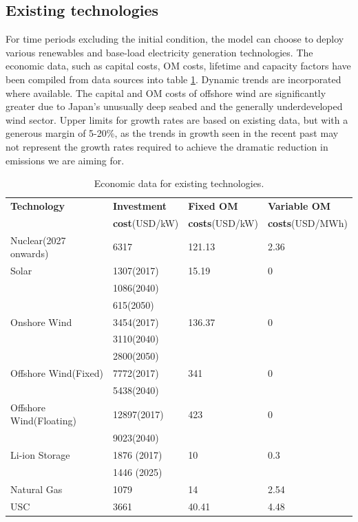 \subsection{Existing technologies}

For time periods excluding the initial condition, the model can choose to deploy various renewables and base-load electricity generation technologies. The economic data, such as capital costs, \gls{OM} costs, lifetime and capacity factors have been compiled from data sources into table \ref{existing-eco}. Dynamic trends are incorporated where available. The capital and \gls{OM} costs of offshore wind are significantly greater due to Japan's unusually deep seabed and the generally underdeveloped wind sector. Upper limits for growth rates are based on existing data, but with a generous margin of 5-20\%, as the trends in growth seen in the recent past may not represent the growth rates required to achieve the dramatic reduction in emissions we are aiming for.

\begin{table}[!ht]
	\caption{Economic data for existing technologies.}
	\vspace{0.1in}
	\begin{tabularx}{1.2\textwidth}{p{} p{} p{} p{}}
		\hline
\textbf{Technology} & \textbf{Investment} & \textbf{Fixed \gls{OM}} & \textbf{Variable \gls{OM}} \\
  & \textbf{cost}(USD/kW) & \textbf{costs}(USD/kW) & \textbf{costs}(USD/MWh)\\
\hline
Nuclear(2027 onwards) & 6317 & 121.13 & 2.36  \\
Solar & 1307(2017) & 15.19 & 0 \\
  & 1086(2040) &  &  \\
  & 615(2050) & &  \\
Onshore Wind & 3454(2017) & 136.37 & 0 \\
 & 3110(2040) &  &   \\
 & 2800(2050) & &   \\
Offshore Wind(Fixed) & 7772(2017) & 341 & 0 \\
 & 5438(2040) & & \\
Offshore Wind(Floating) & 12897(2017) & 423 & 0 \\
 & 9023(2040) &  &   \\
Li-ion Storage & 1876 (2017) & 10 & 0.3  \\
& 1446 (2025) &  &  \\
Natural Gas &  1079 & 14 & 2.54 \\
\gls{USC} & 3661 & 40.41 & 4.48 \\
\hline 
\end{tabularx}
\label{existing-eco}
\end{table}

